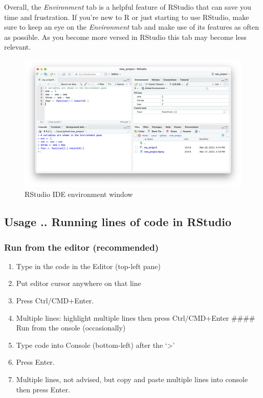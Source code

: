 \documentclass[
]{book}
\providecommand{\tightlist}{%
  \setlength{\itemsep}{0pt}\setlength{\parskip}{0pt}}
\begin{document}
Overall, the \emph{Environment} tab is a helpful feature of RStudio that can save you time and frustration. If you're new to R or just starting to use RStudio, make sure to keep an eye on the \emph{Environment} tab and make use of its features as often as possible. As you become more versed in RStudio this tab may become less relevant.

\begin{figure}
\includegraphics[width=31.94in]{images/02_025_environment} \caption{\label{fig:2025}RStudio IDE environment window}\label{fig:2025}
\end{figure}

\hypertarget{usage-..-running-lines-of-code-in-rstudio}{%
\subsection{Usage .. Running lines of code in RStudio}\label{usage-..-running-lines-of-code-in-rstudio}}

\hypertarget{run-from-the-editor-recommended}{%
\subsubsection{Run from the editor (recommended)}\label{run-from-the-editor-recommended}}

\begin{enumerate}
\def\labelenumi{\arabic{enumi}.}
\tightlist
\item
  Type in the code in the Editor (top-left pane)
\item
  Put editor cursor anywhere on that line
\item
  Press Ctrl/CMD+Enter.
\item
  Multiple lines: highlight multiple lines then press Ctrl/CMD+Enter \#\#\#\# Run from the onsole (occasionally)
\item
  Type code into Console (bottom-left) after the `\textgreater{}'
\item
  Press Enter.
\item
  Multiple lines, not advised, but copy and paste multiple lines into console then press Enter.
\end{enumerate}
\end{document}

